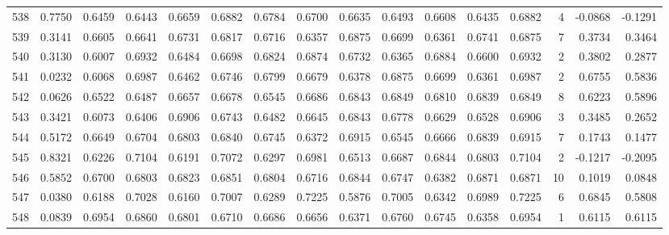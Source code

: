 \begin{tabular}{lrrrrrrrrrrrrrrr}
538 &      0.7750 &  0.6459 &  0.6443 &  0.6659 &  0.6882 &  0.6784 &  0.6700 &  0.6635 &  0.6493 &  0.6608 &   0.6435 &     0.6882 &      4 &                   -0.0868 &                    -0.1291 \\
539 &      0.3141 &  0.6605 &  0.6641 &  0.6731 &  0.6817 &  0.6716 &  0.6357 &  0.6875 &  0.6699 &  0.6361 &   0.6741 &     0.6875 &      7 &                    0.3734 &                     0.3464 \\
540 &      0.3130 &  0.6007 &  0.6932 &  0.6484 &  0.6698 &  0.6824 &  0.6874 &  0.6732 &  0.6365 &  0.6884 &   0.6600 &     0.6932 &      2 &                    0.3802 &                     0.2877 \\
541 &      0.0232 &  0.6068 &  0.6987 &  0.6462 &  0.6746 &  0.6799 &  0.6679 &  0.6378 &  0.6875 &  0.6699 &   0.6361 &     0.6987 &      2 &                    0.6755 &                     0.5836 \\
542 &      0.0626 &  0.6522 &  0.6487 &  0.6657 &  0.6678 &  0.6545 &  0.6686 &  0.6843 &  0.6849 &  0.6810 &   0.6839 &     0.6849 &      8 &                    0.6223 &                     0.5896 \\
543 &      0.3421 &  0.6073 &  0.6406 &  0.6906 &  0.6743 &  0.6482 &  0.6645 &  0.6843 &  0.6778 &  0.6629 &   0.6528 &     0.6906 &      3 &                    0.3485 &                     0.2652 \\
544 &      0.5172 &  0.6649 &  0.6704 &  0.6803 &  0.6840 &  0.6745 &  0.6372 &  0.6915 &  0.6545 &  0.6666 &   0.6839 &     0.6915 &      7 &                    0.1743 &                     0.1477 \\
545 &      0.8321 &  0.6226 &  0.7104 &  0.6191 &  0.7072 &  0.6297 &  0.6981 &  0.6513 &  0.6687 &  0.6844 &   0.6803 &     0.7104 &      2 &                   -0.1217 &                    -0.2095 \\
546 &      0.5852 &  0.6700 &  0.6803 &  0.6823 &  0.6851 &  0.6804 &  0.6716 &  0.6844 &  0.6747 &  0.6382 &   0.6871 &     0.6871 &     10 &                    0.1019 &                     0.0848 \\
547 &      0.0380 &  0.6188 &  0.7028 &  0.6160 &  0.7007 &  0.6289 &  0.7225 &  0.5876 &  0.7005 &  0.6342 &   0.6989 &     0.7225 &      6 &                    0.6845 &                     0.5808 \\
548 &      0.0839 &  0.6954 &  0.6860 &  0.6801 &  0.6710 &  0.6686 &  0.6656 &  0.6371 &  0.6760 &  0.6745 &   0.6358 &     0.6954 &      1 &                    0.6115 &                     0.6115 \\

\end{tabular}
